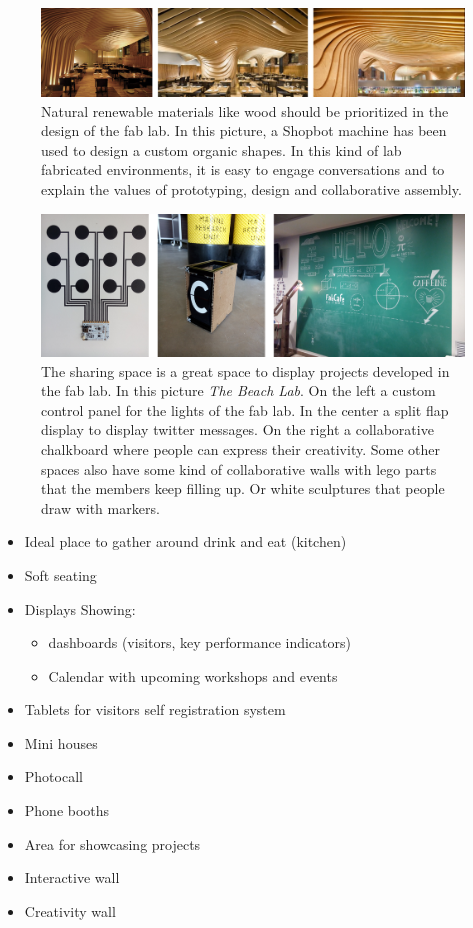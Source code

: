 \documentclass[a4paper,12pt,titlepage]{article}
\begin{document}
\begin{figure}[h] %
   \centering
   \includegraphics[width=16cm]{files/roof} 
   \caption{Natural renewable materials like wood should be prioritized in the design of the fab lab.
In this picture, a Shopbot machine has been used to design a custom organic shapes. In
this kind of lab fabricated environments, it is easy to engage conversations and to
explain the values of prototyping, design and collaborative assembly.}
\end{figure}

\begin{figure}[h] %
   \centering
   \includegraphics[width=16cm]{files/sharing2} 
   \caption{The sharing space is a great space to display projects developed in the fab lab. In this
picture \textit{The Beach Lab}. On the left a custom control panel for the lights of the fab lab.
In the center a split flap display to display twitter messages. On the right a collaborative
chalkboard where people can express their creativity. Some other spaces also have
some kind of collaborative walls with lego parts that the members keep filling up. Or white sculptures that people draw with markers.}
\end{figure}

\begin{itemize}
\item Ideal place to gather around drink and eat (kitchen)
\item Soft seating
\item Displays Showing: 
\begin{itemize}
\item dashboards (visitors, key performance indicators)
\item Calendar with upcoming workshops and events
\end{itemize}
\item Tablets for visitors self registration system
\item Mini houses
\item Photocall
\item Phone booths
\item Area for showcasing projects
\item Interactive wall
\item Creativity wall
\end{itemize}
\end{document}
